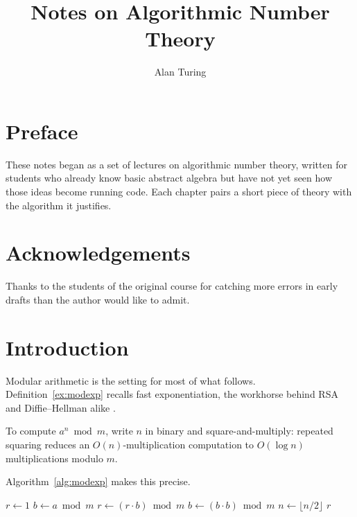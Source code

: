 \documentclass[a4paper]{book}
\title{Notes on Algorithmic Number Theory}
\author{Alan Turing}
\date{}
\begin{document}
\frontmatter

\maketitle

\chapter{Preface}
These notes began as a set of lectures on algorithmic number theory,
written for students who already know basic abstract algebra but have not
yet seen how those ideas become running code. Each chapter pairs a short
piece of theory with the algorithm it justifies.

\chapter{Acknowledgements}
Thanks to the students of the original course for catching more errors in
early drafts than the author would like to admit.

\tableofcontents

\mainmatter

\chapter{Introduction}
\label{ch:introduction}

Modular arithmetic is the setting for most of what follows.
Definition~\ref{ex:modexp} recalls fast exponentiation, the workhorse
behind RSA and Diffie--Hellman alike \citep{cormen2009algorithms}.

\begin{example}
\label{ex:modexp}
To compute $a^n \bmod m$, write $n$ in binary and square-and-multiply:
repeated squaring reduces an $O(n)$-multiplication computation to
$O(\log n)$ multiplications modulo $m$.
\end{example}

Algorithm~\ref{alg:modexp} makes this precise.

\begin{algorithm}
\caption{Modular exponentiation by repeated squaring}
\label{alg:modexp}
\begin{algorithmic}
\State $r \gets 1$
\State $b \gets a \bmod m$
    \State $r \gets (r \cdot b) \bmod m$
  \EndIf
  \State $b \gets (b \cdot b) \bmod m$
  \State $n \gets \lfloor n / 2 \rfloor$
\EndWhile
\State \Return $r$
\end{algorithmic}
\end{algorithm}
\end{document}
